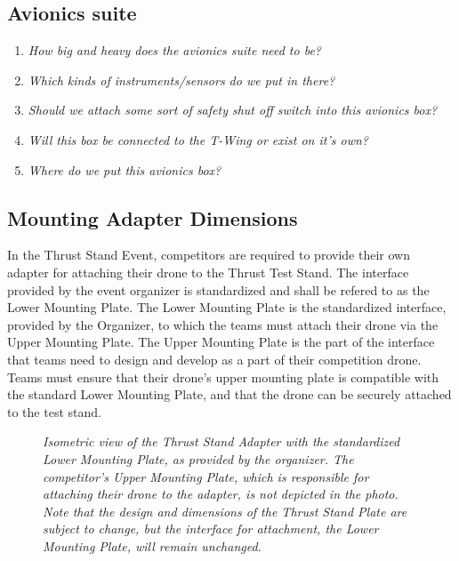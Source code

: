 \documentclass{article}
\begin{document}
\subsection{Avionics suite}
\begin{enumerate}
  \item \emph{How big and heavy does the avionics suite need to be?}
  \item \emph{Which kinds of instruments/sensors do we put in there?}
  \item \emph{Should we attach some sort of safety shut off switch into this avionics box?}
  \item \emph{Will this box be connected to the T-Wing or exist on it's own?}
  \item \emph{Where do we put this avionics box?}
\end{enumerate}

\subsection{Mounting Adapter Dimensions}
In the Thrust Stand Event, competitors are required to provide their own adapter for attaching their drone to the Thrust Test Stand. The interface provided by the event organizer is standardized and shall be refered to as the Lower Mounting Plate. The Lower Mounting Plate is the standardized interface, provided by the Organizer, to which the teams must attach their drone via the Upper Mounting Plate. The Upper Mounting Plate is the part of the interface that teams need to design and develop as a part of their competition drone. Teams must ensure that their drone's upper mounting plate is compatible with the standard Lower Mounting Plate, and that the drone can be securely attached to the test stand. 
\begin{figure}
  \centering
 \caption{\textit{Isometric view of the Thrust Stand Adapter with the standardized Lower Mounting Plate, as provided by the organizer. The competitor's Upper Mounting Plate, which is responsible for attaching their drone to the adapter, is not depicted in the photo. Note that the design and dimensions of the Thrust Stand Plate are subject to change, but the interface for attachment, the Lower Mounting Plate, will remain unchanged.}}
 \end{figure}
\end{document}
